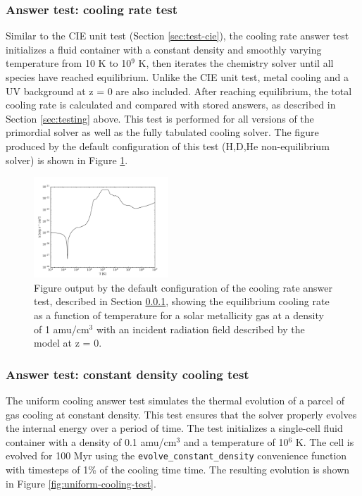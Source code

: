 \subsubsection{Answer test: cooling rate test}
\label{sec:cooling-rate-test}

Similar to the CIE unit test (Section \ref{sec:test-cie}), the cooling
rate answer test initializes a fluid container with a constant density
and smoothly varying temperature from 10 K to 10$^{9}$ K, then
iterates the chemistry solver until all species have reached
equilibrium.  Unlike the CIE unit test, metal cooling and a
\citet{2012ApJ...746..125H} UV background at z = 0 are also included.
After reaching equilibrium, the total cooling rate is calculated and
compared with stored answers, as described in Section
\ref{sec:testing} above.  This test is performed for all versions of
the primordial solver as well as the fully tabulated cooling solver.
The figure produced by the default configuration of this test
(H,D,He non-equilibrium solver) is shown in Figure
\ref{fig:cooling-rate-test}.

\begin{figure}
  \centering
  \includegraphics[width=0.45\textwidth]{cooling_rate.pdf}
  \caption{
    Figure output by the default configuration of the cooling rate
    answer test, described in Section \ref{sec:cooling-rate-test},
    showing the equilibrium cooling rate as a function of temperature
    for a solar metallicity gas at a density of 1 amu/cm$^{3}$ with an
    incident radiation field described by the
    \citet{2012ApJ...746..125H} model at z = 0.
  } \label{fig:cooling-rate-test}
\end{figure}

\subsubsection{Answer test: constant density cooling test}
\label{sec:uniform-cooling-test}

The uniform cooling answer test simulates the thermal evolution of a
parcel of gas cooling at constant density.  This test ensures that the
solver properly evolves the internal energy over a period of time.
The test initializes a single-cell fluid container with a density of
0.1 amu/cm$^{3}$ and a temperature of 10$^{6}$ K.  The cell is evolved
for 100 Myr using the \texttt{evolve\_constant\_density} convenience
function with timesteps of 1\% of the cooling time time.  The
resulting evolution is shown in Figure
\ref{fig:uniform-cooling-test}.

